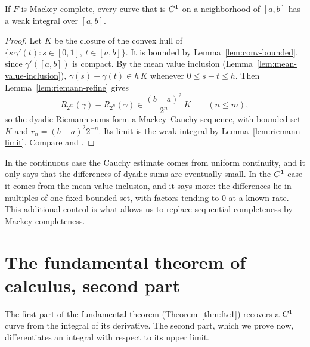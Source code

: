 \begin{theorem}
  \label{thm:exists-mackey}
  \leanok
  If $F$ is Mackey complete, every curve that is $C^{1}$ on a neighborhood of $[a, b]$ has a weak
  integral over $[a, b]$.
\end{theorem}

\begin{proof}
  \leanok
  Let $K$ be the closure of the convex hull of $\{s\,\gamma'(t) : s \in [0, 1],\ t \in [a, b]\}$.
  It is bounded by Lemma~\ref{lem:conv-bounded}, since $\gamma'([a, b])$ is compact. By the mean
  value inclusion (Lemma~\ref{lem:mean-value-inclusion}), $\gamma(s) - \gamma(t) \in h\, K$
  whenever $0 \leq s - t \leq h$. Then Lemma~\ref{lem:riemann-refine} gives
  \[
    R_{2^m}(\gamma) - R_{2^n}(\gamma) \in \frac{(b - a)^2}{2^n}\, K \qquad (n \leq m),
  \]
  so the dyadic Riemann sums form a Mackey--Cauchy sequence, with bounded set $K$ and
  $r_n = (b - a)^2 2^{-n}$. Its limit is the weak integral by Lemma~\ref{lem:riemann-limit}.
  Compare \cite[1.1.18]{GN26} and \cite[2.14]{KM97}.
\end{proof}

\begin{remark}
  In the continuous case the Cauchy estimate comes from uniform continuity, and it only says
  that the differences of dyadic sums are eventually small. In the $C^{1}$ case it comes from
  the mean value inclusion, and it says more: the differences lie in multiples of one fixed
  bounded set, with factors tending to $0$ at a known rate. This additional control is what
  allows us to replace sequential completeness by Mackey completeness.
\end{remark}

\section{The fundamental theorem of calculus, second part}
\label{sec:ftc2}

The first part of the fundamental theorem (Theorem~\ref{thm:ftc1}) recovers a $C^{1}$ curve
from the integral of its derivative. The second part, which we prove now, differentiates an
integral with respect to its upper limit.

